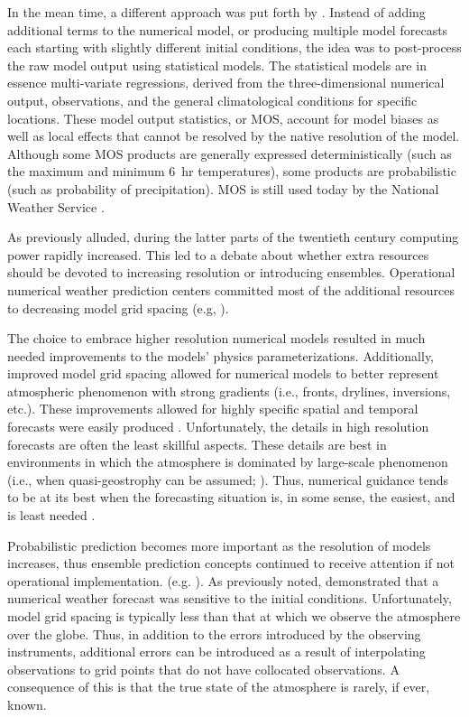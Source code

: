In the mean time, a different approach was put forth by \cite{Glahn1972}.
Instead of adding additional terms to the numerical model, or producing multiple model forecasts each starting with slightly different initial conditions, the idea was to post-process the raw model output using statistical models.
The statistical models are in essence multi-variate regressions, derived from the three-dimensional numerical output, observations, and the general climatological conditions for specific locations.
These model output statistics, or MOS, account for model biases as well as local effects that cannot be resolved by the native resolution of the model.
Although some MOS products are generally expressed deterministically (such as the maximum and minimum \mbox{6 hr} temperatures), some products are probabilistic (such as probability of precipitation).
MOS is still used today by the National Weather Service \citep{Allen2001a, Allen2001b, Sfanos2001, Carroll2005, Glahn2009}.


As previously alluded, during the latter parts of the twentieth century computing power rapidly increased.
This led to a debate about whether extra resources should be devoted to increasing resolution or introducing ensembles.
Operational numerical weather prediction centers committed most of the additional resources to decreasing model grid spacing (e.g, \citealp{McPherson1991, WMO1992}).


The choice to embrace higher resolution numerical models resulted in much needed improvements to the models' physics parameterizations.
Additionally, improved model grid spacing allowed for numerical models to better represent atmospheric phenomenon with strong gradients (i.e., fronts, drylines, inversions, etc.).
These improvements allowed for highly specific spatial and temporal forecasts were easily produced \citep{Droegemeier1990}.
Unfortunately, the details in high resolution forecasts are often the least skillful aspects.
These details are best in environments in which the atmosphere is dominated by large-scale phenomenon (i.e., when quasi-geostrophy can be assumed; \citealp{Antolik1989}).
Thus, numerical guidance tends to be at its best when the forecasting situation is, in some sense, the easiest, and is least needed \citep{Brooks1993}.


Probabilistic prediction becomes more important as the resolution of models increases, thus ensemble prediction concepts continued to receive attention if not operational implementation. (e.g. \citealp{Brooks1992a, Brooks1993}).
As previously noted, \cite{Lorenz1963, Lorenz1965, Lorenz1968} demonstrated that a numerical weather forecast was sensitive to the initial conditions.
Unfortunately, model grid spacing is typically less than that at which we observe the atmosphere over the globe.
Thus, in addition to the errors introduced by the observing instruments, additional errors can be introduced as a result of interpolating observations to grid points that do not have collocated observations.
A consequence of this is that the true state of the atmosphere is rarely, if ever, known.


